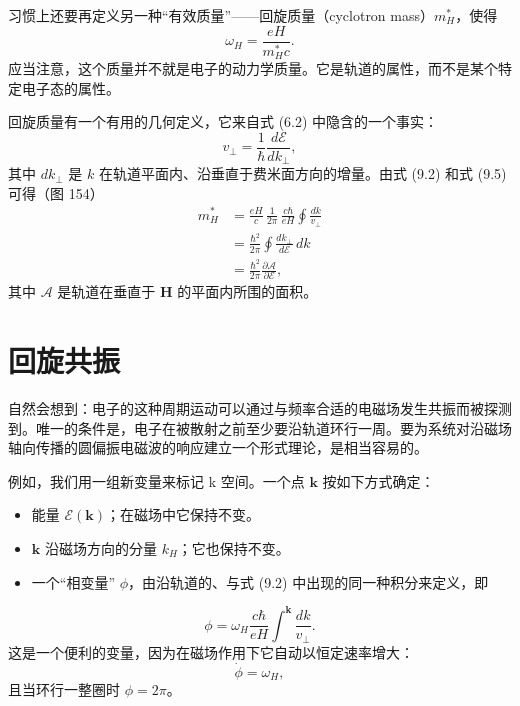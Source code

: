习惯上还要再定义另一种“有效质量”——回旋质量（cyclotron mass）$m_H^{*}$，使得
\begin{equation*}
\omega_H=\frac{eH}{m_H^{*}c}. \tag{9.5}
\end{equation*}
应当注意，这个质量并不就是电子的动力学质量。它是轨道的属性，而不是某个特定电子态的属性。

回旋质量有一个有用的几何定义，它来自式 (6.2) 中隐含的一个事实：
\begin{equation*}
v_{\perp}=\frac{1}{\hbar}\frac{d\mathcal{E}}{dk_{\perp}}, \tag{9.6}
\end{equation*}
其中 $dk_{\perp}$ 是 $k$ 在轨道平面内、沿垂直于费米面方向的增量。由式 (9.2) 和式 (9.5) 可得（图 154）
\begin{align*}
m_H^{*}&=\frac{eH}{c}\,\frac{1}{2\pi}\,\frac{c\hbar}{eH}\oint\frac{dk}{v_{\perp}}\\
&=\frac{\hbar^{2}}{2\pi}\oint\frac{dk_{\perp}}{d\mathcal{E}}\,dk\\
&=\frac{\hbar^{2}}{2\pi}\frac{\partial\mathcal{A}}{\partial\mathcal{E}}, \tag{9.7}
\end{align*}
其中 $\mathcal{A}$ 是轨道在垂直于 $\mathbf{H}$ 的平面内所围的面积。

\section{回旋共振}

自然会想到：电子的这种周期运动可以通过与频率合适的电磁场发生共振而被探测到。唯一的条件是，电子在被散射之前至少要沿轨道环行一周。要为系统对沿磁场轴向传播的圆偏振电磁波的响应建立一个形式理论，是相当容易的。

例如，我们用一组新变量来标记 k 空间。一个点 $\mathbf{k}$ 按如下方式确定：
\begin{itemize}
\item[(i)] 能量 $\mathcal{E}(\mathbf{k})$；在磁场中它保持不变。
\item[(ii)] $\mathbf{k}$ 沿磁场方向的分量 $k_H$；它也保持不变。
\item[(iii)] 一个“相变量” $\phi$，由沿轨道的、与式 (9.2) 中出现的同一种积分来定义，即
\end{itemize}
\begin{equation*}
\phi=\omega_H\frac{c\hbar}{eH}\int^{\mathbf{k}}\frac{dk}{v_{\perp}}. \tag{9.8}
\end{equation*}
这是一个便利的变量，因为在磁场作用下它自动以恒定速率增大：
\begin{equation*}
\dot{\phi}=\omega_H, \tag{9.9}
\end{equation*}
且当环行一整圈时 $\phi=2\pi$。

